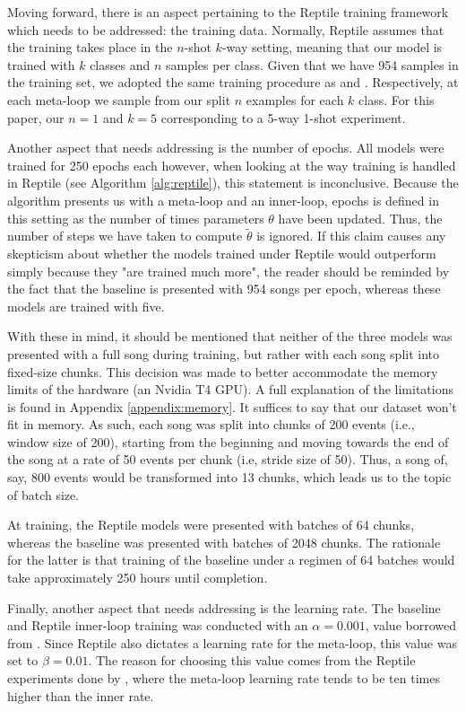 \documentclass[a4paper]{book}
\begin{document}
Moving forward, there is an aspect pertaining to the Reptile training framework which needs to be addressed: the training data. Normally, Reptile assumes that the training takes place in the $n$-shot $k$-way setting, meaning that our model is trained with $k$ classes and $n$ samples per class. Given that we have 954 samples in the training set, we adopted the same training procedure as \textcite{nichol_first-order_2018} and \textcite{clouatre_figr_2019}. Respectively, at each meta-loop we sample from our split $n$ examples for each $k$ class. For this paper, our $n=1$ and $k=5$ corresponding to a 5-way 1-shot experiment.

Another aspect that needs addressing is the number of epochs. All models were trained for 250 epochs each however, when looking at the way training is handled in Reptile (see Algorithm \ref{alg:reptile}), this statement is inconclusive. Because the algorithm presents us with a meta-loop and an inner-loop, epochs is defined in this setting as the number of times parameters $\theta$ have been updated. Thus, the number of steps we have taken to compute $\tilde \theta$ is ignored. If this claim causes any skepticism about whether the models trained under Reptile would outperform simply because they "are trained much more", the reader should be reminded by the fact that the baseline is presented with 954 songs per epoch, whereas these models are trained with five.

With these in mind, it should be mentioned that neither of the three models was presented with a full song during training, but rather with each song split into fixed-size chunks. This decision was made to better accommodate the memory limits of the hardware (an Nvidia T4 GPU). A full explanation of the limitations is found in Appendix \ref{appendix:memory}. It suffices to say that our dataset won't fit in memory. As such, each song was split into chunks of 200 events (i.e., window size of 200), starting from the beginning and moving towards the end of the song at a rate of 50 events per chunk (i.e, stride size of 50). Thus, a song of, say, 800 events would be transformed into 13 chunks, which leads us to the topic of batch size.

At training, the Reptile models were presented with batches of 64 chunks, whereas the baseline was presented with batches of 2048 chunks. The rationale for the latter is that training of the baseline under a regimen of 64 batches would take approximately 250 hours until completion.

Finally, another aspect that needs addressing is the learning rate. The baseline and Reptile inner-loop training was conducted with an $\alpha = 0.001$, value borrowed from \textcite{oore_this_2018}. Since Reptile also dictates a learning rate for the meta-loop, this value was set to $\beta = 0.01$. The reason for choosing this value comes from the Reptile experiments done by \textcite{nichol_first-order_2018}, where the meta-loop learning rate tends to be ten times higher than the inner rate. 
\end{document}
